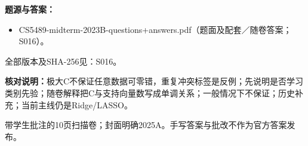 \textbf{题源与答案：}

\begin{itemize}

\item CS5489-midterm-2023B-questions+answers.pdf（题面及配套／随卷答案；S016）。

\end{itemize}

全部版本及SHA-256见：S016。

\textbf{核对说明：}极大C不保证任意数据可零错，重复冲突标签是反例；先说明是否学习类别先验；随卷解释把C与支持向量数写成单调关系；一般情况下不保证；历史补充；当前主线仍是Ridge/LASSO。



带学生批注的10页扫描卷；封面明确2025A。手写答案与批改不作为官方答案发布。

